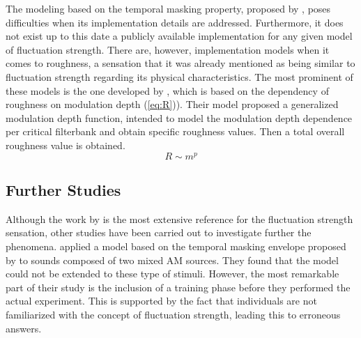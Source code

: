 \documentclass[../main.tex]{subfiles}
\begin{document}
\begin{theoreticalbackground}
The modeling based on the temporal masking property, proposed by
\citeauthor{Fastl2007Psychoacoustics}, poses difficulties when its
implementation details are addressed. Furthermore, it does not exist up to this
date a publicly available implementation for any given model of fluctuation
strength. There are, however, implementation models when it comes to roughness,
a sensation that it was already mentioned as being similar to fluctuation
strength regarding its physical characteristics. The most prominent of these
models is the one developed by \citeauthor{daniel1997psychoacoustical}
\cite{daniel1997psychoacoustical}, which is based on the dependency of roughness
on modulation depth (\cref{eq:R})). Their model proposed a generalized
modulation depth function, intended to model the modulation depth dependence
per critical filterbank and obtain specific roughness values. Then a total
overall roughness value is obtained.
\begin{equation}
   R \sim m^p
   \label{eq:R}
\end{equation}

\subsection{Further Studies}

Although the work by \citeauthor{Fastl2007Psychoacoustics} is the most extensive
reference for the fluctuation strength sensation, other studies have been
carried out to investigate further the phenomena.
\citeauthor{Accolti2009Fluctuation} applied a model based on the temporal
masking envelope proposed by \citeauthor{Fastl2007Psychoacoustics} to sounds
composed of two mixed \gls{AM} sources. They found that the model could not be
extended to these type of stimuli. However, the most remarkable part of their
study is the inclusion of a training phase before they performed the actual
experiment. This is supported by the fact that individuals are not familiarized
with the concept of fluctuation strength, leading this to erroneous answers.


\end{theoreticalbackground}
\end{document}
